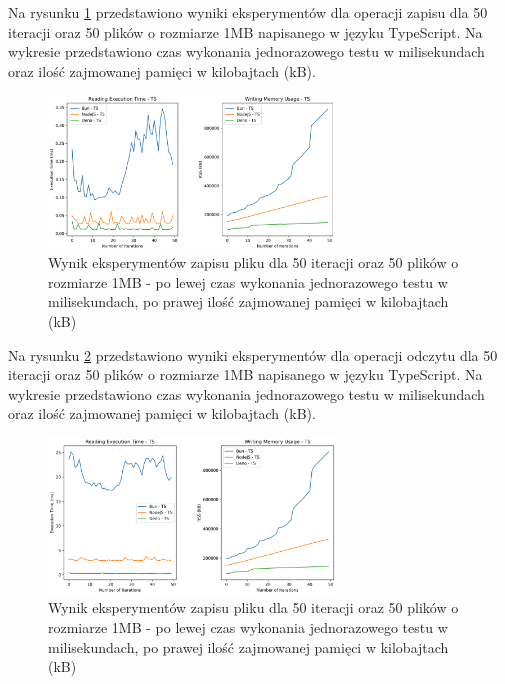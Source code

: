 Na rysunku \ref{fig:file_e2_reading_ts} przedstawiono wyniki eksperymentów dla operacji zapisu dla 50 iteracji oraz 50 plików o rozmiarze 1MB napisanego w języku TypeScript. Na wykresie przedstawiono czas wykonania jednorazowego testu w milisekundach oraz ilość zajmowanej pamięci w kilobajtach (kB).

\begin{figure}[H]
  \centering
  \includegraphics[width=0.68\textwidth]{Figures/files/files_reading_50_2000_50_ts.png}
  \caption{Wynik eksperymentów zapisu pliku dla 50 iteracji oraz 50 plików o rozmiarze 1MB - po lewej czas wykonania jednorazowego testu w milisekundach, po prawej ilość zajmowanej pamięci w kilobajtach (kB)}
  \label{fig:file_e2_reading_ts}
\end{figure}

Na rysunku \ref{fig:file_e2_writing_ts} przedstawiono wyniki eksperymentów dla operacji odczytu dla 50 iteracji oraz 50 plików o rozmiarze 1MB napisanego w języku TypeScript. Na wykresie przedstawiono czas wykonania jednorazowego testu w milisekundach oraz ilość zajmowanej pamięci w kilobajtach (kB).

\begin{figure}[H]
  \centering
  \includegraphics[width=0.68\textwidth]{Figures/files/files_writing_50_2000_50_ts.png}
  \caption{Wynik eksperymentów zapisu pliku dla 50 iteracji oraz 50 plików o rozmiarze 1MB - po lewej czas wykonania jednorazowego testu w milisekundach, po prawej ilość zajmowanej pamięci w kilobajtach (kB)}
  \label{fig:file_e2_writing_ts}
\end{figure}

